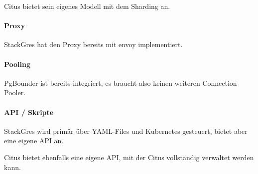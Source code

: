 \begin{flushleft}
    Citus bietet sein eigenes Modell mit dem Sharding an.
\end{flushleft}
\begin{flushleft}
    \paragraph{Proxy}
    StackGres hat den Proxy bereits mit envoy \cite{QAGSHVBL} implementiert.
\end{flushleft}
\begin{flushleft}
    \paragraph{Pooling}
    PgBounder \cite{ATBELZ2X} ist bereits integriert, es braucht also keinen weiteren \Gls{Connection Pooler}.
\end{flushleft}
\begin{flushleft}
    \paragraph{API / Skripte}
    StackGres wird primär über YAML-Files und Kubernetes gesteuert, bietet aber eine eigene API an.
\end{flushleft}
\begin{flushleft}
    Citus bietet ebenfalls eine eigene API, mit der Citus vollständig verwaltet werden kann.
\end{flushleft}

